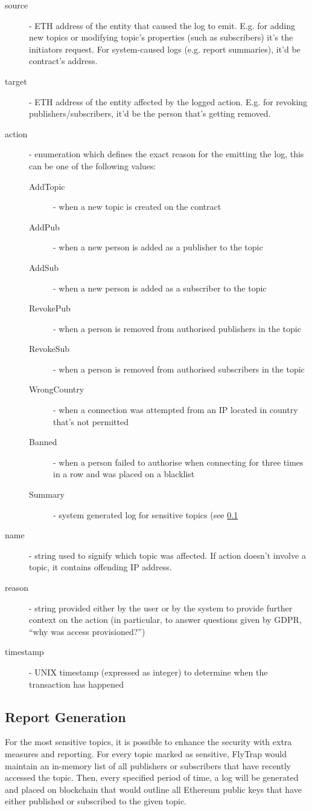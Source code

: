 \begin{description}
    \item[source] - ETH address of the entity that caused the log to emit. E.g. for adding new topics or modifying topic's properties (such as subscribers) it's the initiators request. For system-caused logs (e.g. report summaries), it'd be contract's address.
    \item[target] - ETH address of the entity affected by the logged action. E.g. for revoking publishers/subscribers, it'd be the person that's getting removed.
    \item[action] - enumeration which defines the exact reason for the emitting the log, this can be one of the following values:
    \begin{description}
        \item[AddTopic] - when a new topic is created on the contract
        \item[AddPub] - when a new person is added as a publisher to the topic
        \item[AddSub] - when a new person is added as a subscriber to the topic
        \item[RevokePub] - when a person is removed from authorised publishers in the topic
        \item[RevokeSub] - when a person is removed from authorised subscribers in the topic
        \item[WrongCountry] - when a connection was attempted from an IP located in country that's not permitted
        \item[Banned] - when a person failed to authorise when connecting for three times in a row and was placed on a blacklist
        \item[Summary] - system generated log for sensitive topics (see \ref{sec:reports}
    \end{description}
    \item[name] - string used to signify which topic was affected. If action doesn't involve a topic, it contains offending IP address.
    \item[reason] - string provided either by the user or by the system to provide further context on the action (in particular, to answer questions given by GDPR, ``why was access provisioned?'')
    \item[timestamp] - UNIX timestamp (expressed as integer) to determine when the transaction has happened
\end{description}
\subsection{Report Generation} \label{sec:reports}
For the most sensitive topics, it is possible to enhance the security with extra measures and reporting. For every topic marked as sensitive, FlyTrap would maintain an in-memory list of all publishers or subscribers that have recently accessed the topic. Then, every specified period of time, a log will be generated and placed on blockchain that would outline all Ethereum public keys that have either published or subscribed to the given topic.

